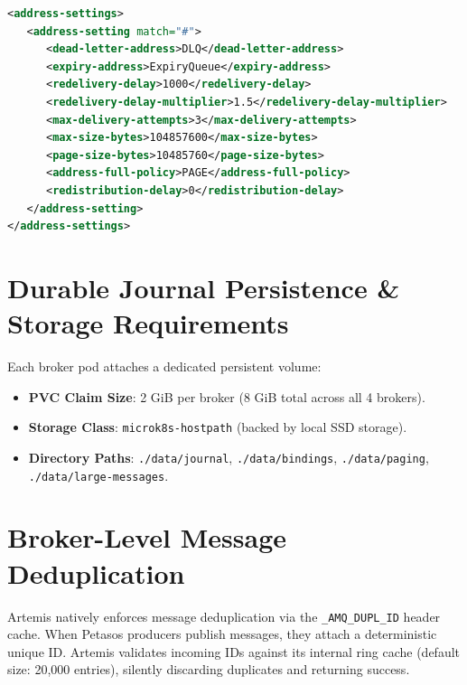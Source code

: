 \begin{lstlisting}[language=XML, caption={Authoritative ActiveMQ Artemis Address Settings in \texttt{broker.xml}}]
<address-settings>
   <address-setting match="#">
      <dead-letter-address>DLQ</dead-letter-address>
      <expiry-address>ExpiryQueue</expiry-address>
      <redelivery-delay>1000</redelivery-delay>
      <redelivery-delay-multiplier>1.5</redelivery-delay-multiplier>
      <max-delivery-attempts>3</max-delivery-attempts>
      <max-size-bytes>104857600</max-size-bytes>
      <page-size-bytes>10485760</page-size-bytes>
      <address-full-policy>PAGE</address-full-policy>
      <redistribution-delay>0</redistribution-delay>
   </address-setting>
</address-settings>
\end{lstlisting}

\section{Durable Journal Persistence \& Storage Requirements}

Each broker pod attaches a dedicated persistent volume:
\begin{itemize}
    \item \textbf{PVC Claim Size}: 2 GiB per broker (8 GiB total across all 4 brokers).
    \item \textbf{Storage Class}: \texttt{microk8s-hostpath} (backed by local SSD storage).
    \item \textbf{Directory Paths}: \texttt{./data/journal}, \texttt{./data/bindings}, \texttt{./data/paging}, \texttt{./data/large-messages}.
\end{itemize}

\section{Broker-Level Message Deduplication}

Artemis natively enforces message deduplication via the \texttt{\_AMQ\_DUPL\_ID} header cache. When Petasos producers publish messages, they attach a deterministic unique ID. Artemis validates incoming IDs against its internal ring cache (default size: 20,000 entries), silently discarding duplicates and returning success.

\newpage
